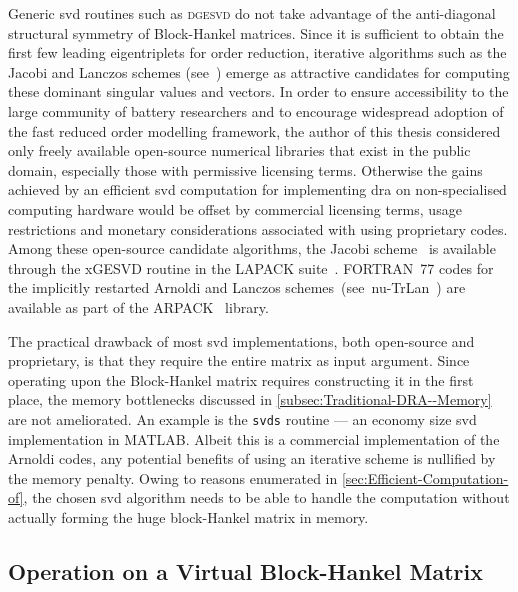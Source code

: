 Generic  \gls{svd}  routines  such  as \textsc{dgesvd}  do  not  take  advantage
of  the  anti-diagonal  structural  symmetry  of  Block-Hankel  matrices.  Since
it  is sufficient  to  obtain  the first  few  leading  eigentriplets for  order
reduction,  iterative  algorithms  such  as   the  Jacobi  and  Lanczos  schemes
(see~\cite{Golub2013})  emerge  as  attractive candidates  for  computing  these
dominant singular  values and vectors. In  order to ensure accessibility  to the
large community of  battery researchers and to encourage  widespread adoption of
the fast reduced order modelling framework, the author of this thesis considered
only freely available  open-source numerical libraries that exist  in the public
domain, especially  those with permissive  licensing terms. Otherwise  the gains
achieved by  an efficient  \gls{svd} computation  for implementing  \gls{dra} on
non-specialised  computing  hardware would  be  offset  by commercial  licensing
terms,  usage restrictions  and  monetary considerations  associated with  using
proprietary  codes. Among  these  open-source candidate  algorithms, the  Jacobi
scheme~\cite{Golub2013} is  available through the  xGESVD routine in  the LAPACK
suite~\cite{Anderson1999}. FORTRAN~77 codes for the implicitly restarted Arnoldi
and Lanczos schemes~(see~nu-TrLan~\cite{Yamazaki2008}) are  available as part of
the ARPACK~\cite{Lehoucq1998} library.

The practical drawback  of most \gls{svd} implementations,  both open-source and
proprietary, is  that they require  the entire  matrix as input  argument. Since
operating upon  the Block-Hankel  matrix requires constructing  it in  the first
place, the memory bottlenecks discussed in \cref{subsec:Traditional-DRA--Memory}
are not  ameliorated. An  example is  the \texttt{svds}  routine ---  an economy
size  \gls{svd}  implementation  in  MATLAB\@.   Albeit  this  is  a  commercial
implementation  of  the  Arnoldi  codes,  any potential  benefits  of  using  an
iterative scheme is nullified by the memory penalty. Owing to reasons enumerated
in \cref{sec:Efficient-Computation-of}, the chosen  \gls{svd} algorithm needs to
be able to handle the computation without actually forming the huge block-Hankel
matrix in memory.

\subsection{ Operation on a Virtual Block-Hankel Matrix}

